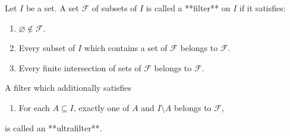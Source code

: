 Let $I$ be a set. A set $\mathcal{F}$ of subsets of $I$ is called a **filter** on $I$ if it satisfies:
\begin{enumerate}
\item[(i)] $\varnothing \notin \mathcal{F}$.
\item[(ii)] Every subset of $I$ which contains a set of $\mathcal{F}$ belongs to $\mathcal{F}$.
\item[(iii)] Every finite intersection of sets of $\mathcal{F}$ belongs to $\mathcal{F}$.
\end{enumerate}
A filter which additionally satisfies
\begin{enumerate}
\item[(iv)] For each $A \subseteq I$, exactly one of $A$ and $I \setminus A$ belongs to $\mathcal{F}$,
\end{enumerate}
is called an **ultrafilter**.

